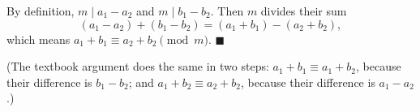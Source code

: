 By definition, $m\mid a_1-a_2$ and $m\mid b_1-b_2$. Then $m$ divides their sum
\[(a_1-a_2)+(b_1-b_2)=(a_1+b_1)-(a_2+b_2),\]
which means $a_1+b_1\equiv a_2+b_2\pmod m$. $\blacksquare$

(The textbook argument does the same in two steps: $a_1+b_1\equiv a_1+b_2$, because their difference is $b_1-b_2$; and $a_1+b_2\equiv a_2+b_2$, because their difference is $a_1-a_2$.)
